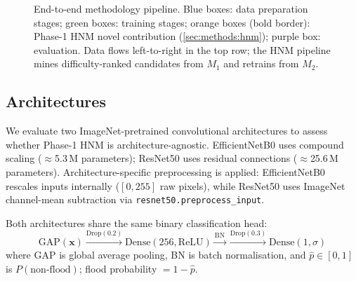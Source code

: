 \documentclass[a4paper,fleqn]{cas-sc}
\newcommand{\EffNet}{EfficientNetB0\xspace}
\newcommand{\ResNet}{ResNet50\xspace}
\newcommand{\PHNM}{Phase-1 HNM\xspace}
\begin{document}
\begin{figure}
  \caption{End-to-end methodology pipeline.
           Blue boxes: data preparation stages;
           green boxes: training stages;
           orange boxes (bold border): Phase-1 HNM novel contribution
           (\cref{sec:methods:hnm});
           purple box: evaluation.
           Data flows left-to-right in the top row; the HNM pipeline mines
           difficulty-ranked candidates from $M_1$ and retrains from $M_2$.}
  \label{fig:pipeline}
\end{figure}

\subsection{Architectures}
\label{sec:methods:arch}

We evaluate two ImageNet-pretrained convolutional architectures to assess whether \PHNM{} is architecture-agnostic.
\EffNet{} \cite{Tan2019} uses compound scaling ($\approx$5.3\,M parameters); \ResNet{} \cite{He2016} uses residual connections ($\approx$25.6\,M parameters).
Architecture-specific preprocessing is applied: \EffNet{} rescales inputs internally ($[0,255]$ raw pixels),
while \ResNet{} uses ImageNet channel-mean subtraction via \texttt{resnet50.preprocess\_input}.

Both architectures share the same binary classification head:
\begin{equation}
  \text{GAP}(\mathbf{x})
  \xrightarrow{\text{Drop}(0.2)}
  \text{Dense}(256, \text{ReLU})
  \xrightarrow{\text{BN}}
  \xrightarrow{\text{Drop}(0.3)}
  \text{Dense}(1, \sigma)
  \label{eq:head}
\end{equation}
where GAP is global average pooling, BN is batch normalisation, and $\hat{p} \in [0,1]$ is
$P(\text{non-flood})$; flood probability $= 1-\hat{p}$.
\end{document}
